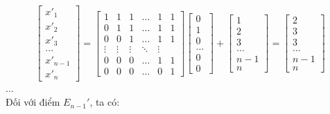 \documentclass[12pt,a4paper]{article}
\begin{document}
\[
\begin{bmatrix}
    x'_1 \\ x'_2 \\ x'_3 \\ ... \\ x'_{n-1} \\ x'_n
\end{bmatrix} = \begin{bmatrix}
1 & 1 & 1 & \dots & 1 & 1 \\
0 & 1 & 1 & \dots & 1 & 1 \\
0 & 0 & 1 & \dots & 1 & 1 \\
\vdots & \vdots & \vdots & \ddots & \vdots \\
0 & 0 & 0 & \dots & 1 & 1 \\
0 & 0 & 0 & \dots & 0 & 1
\end{bmatrix} \begin{bmatrix}
    0 \\ 1 \\ 0 \\ \dots \\ 0 \\ 0
\end{bmatrix} + \begin{bmatrix}
    1 \\ 2 \\ 3 \\ ... \\ n-1 \\ n
\end{bmatrix} = \begin{bmatrix}
    2 \\ 3 \\ 3 \\ \dots \\ n-1 \\ n
\end{bmatrix}
\]
... \\[4pt]
Đối với điểm \(E_{n-1}'\), ta có: 
\end{document}
